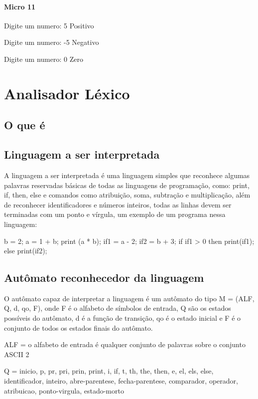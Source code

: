 \documentclass[12pt,a4paper,twoside]{report}
\begin{document}
\subsubsection{Micro 11}


\begin{terminal}
Digite um numero: 5
Positivo

Digite um numero: -5
Negativo

Digite um numero: 0
Zero
\end{terminal}

\chapter{Analisador Léxico}
\section{O que é}
\section{Linguagem a ser interpretada}
A linguagem a ser interpretada é uma linguagem simples que reconhece algumas palavras reservadas básicas de todas as linguagens de programação, como: print, if, then, else e comandos como atribuição, soma, subtração e multiplicação, além de reconhecer identificadores e números inteiros, todas as linhas devem ser terminadas com um ponto e vírgula, um exemplo de um programa nessa linguagem:

\begin{terminal}
b = 2;
a = 1 + b;
print (a * b);
if1 = a - 2;
if2 = b + 3;
if if1 > 0
then print(if1);
else print(if2);
\end{terminal}


\section{Autômato reconhecedor da linguagem}
O autômato capaz de interpretar a linguagem é um autômato do tipo M = (ALF, Q, d, qo, F), onde F é o alfabeto de símbolos de entrada, Q são os estados possíveis do autômato, d é a função de transição, qo é o estado inicial e F é o conjunto de todos os estados finais do autômato.

ALF = o alfabeto de entrada é qualquer conjunto de palavras sobre o conjunto ASCII 2

Q = {inicio, p, pr, pri, prin, print, i, if, t, th, the, then, e, el, els, else, identificador, inteiro, abre-parentese, fecha-parentese, comparador, operador, atribuicao, ponto-virgula, estado-morto}
\end{document}
